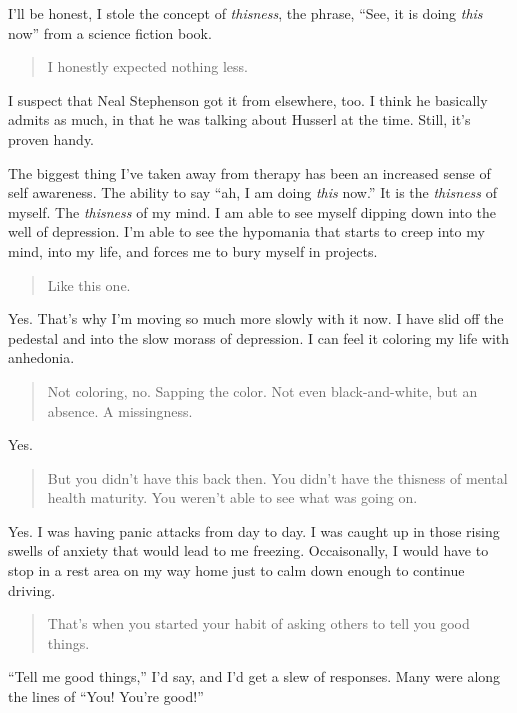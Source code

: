 I'll be honest, I stole the concept of \emph{thisness}, the phrase, ``See, it is doing \emph{this} now'' from a science fiction book.

\begin{quote}
I honestly expected nothing less.
\end{quote}

I suspect that Neal Stephenson got it from elsewhere, too. I think he basically admits as much, in that he was talking about Husserl at the time. Still, it's proven handy.

The biggest thing I've taken away from therapy has been an increased sense of self awareness. The ability to say ``ah, I am doing \emph{this} now.'' It is the \emph{thisness} of myself. The \emph{thisness} of my mind. I am able to see myself dipping down into the well of depression. I'm able to see the hypomania that starts to creep into my mind, into my life, and forces me to bury myself in projects.

\begin{quote}
Like this one.
\end{quote}

Yes. That's why I'm moving so much more slowly with it now. I have slid off the pedestal and into the slow morass of depression. I can feel it coloring my life with anhedonia.

\begin{quote}
Not coloring, no. Sapping the color. Not even black-and-white, but an absence. A missingness.
\end{quote}

Yes.

\begin{quote}
But you didn't have this back then. You didn't have the thisness of mental health maturity. You weren't able to see what was going on.
\end{quote}

Yes. I was having panic attacks from day to day. I was caught up in those rising swells of anxiety that would lead to me freezing. Occaisonally, I would have to stop in a rest area on my way home just to calm down enough to continue driving.

\begin{quote}
That's when you started your habit of asking others to tell you good things.
\end{quote}

``Tell me good things,'' I'd say, and I'd get a slew of responses. Many were along the lines of ``You! You're good!''

